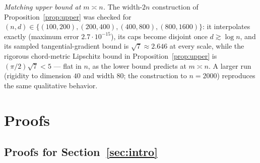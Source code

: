 \documentclass[11pt,reqno]{amsart}
\theoremstyle{plain}
\theoremstyle{definition}
\theoremstyle{remark}
\begin{document}
\emph{Matching upper bound at $m\asymp n$.} The width-$2n$ construction of Proposition~\ref{prop:upper} was checked for $(n,d)\in\{(100,200),(200,400),(400,800),(800,1600)\}$: it interpolates exactly (maximum error $2.7\cdot10^{-15}$), its caps become disjoint once $d\gtrsim\log n$, and its sampled tangential-gradient bound is $\sqrt7\approx2.646$ at every scale, while the rigorous chord-metric Lipschitz bound in Proposition~\ref{prop:upper} is $(\pi/2)\sqrt7<5$ --- flat in $n$, as the lower bound predicts at $m\asymp n$. A larger run (rigidity to dimension $40$ and width $80$; the construction to $n=2000$) reproduces the same qualitative behavior.



\appendix

\section{Proofs}\label{app:proofs}

\subsection{Proofs for Section~\ref{sec:intro}}
\end{document}
